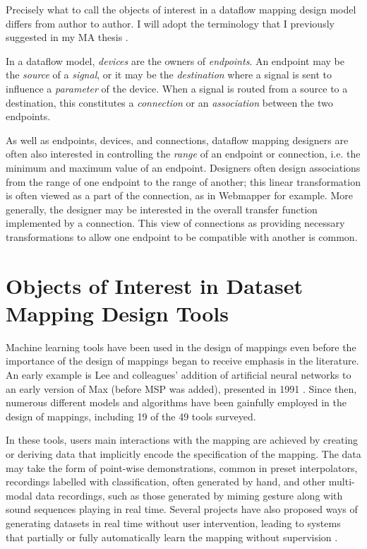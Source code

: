 \documentclass[main.tex]{subfiles}
\begin{document}

Precisely what to call the objects of interest in a dataflow mapping design
model differs from author to author. I will adopt the terminology that I
previously suggested in my MA thesis \cite{West2020thesis}.

In a dataflow model, \emph{devices} are the owners of \emph{endpoints}.  An
endpoint may be the \emph{source} of a \emph{signal}, or it may be the
\emph{destination} where a signal is sent to influence a \emph{parameter} of
the device.  When a signal is routed from a source to a destination, this
constitutes a \emph{connection} or an \emph{association} between the two
endpoints.

As well as endpoints, devices, and connections, dataflow mapping designers are
often also interested in controlling the \emph{range} of an endpoint or
connection, i.e. the minimum and maximum value of an endpoint. Designers often
design associations from the range of one endpoint to the range of another;
this linear transformation is often viewed as a part of the connection, as in
Webmapper \cite{Wang2019} for example. More generally, the designer may be
interested in the overall transfer function implemented by a connection. This
view of connections as providing necessary transformations to allow one endpoint
to be compatible with another is common.

\section{Objects of Interest in Dataset Mapping Design Tools}

Machine learning tools have been used in the design of mappings even before the
importance of the design of mappings began to receive emphasis in the
literature.  An early example is Lee and colleagues' addition of artificial
neural networks to an early version of Max (before MSP was added), presented in
1991 \cite{lee1991ann}.  Since then, numerous different models and algorithms
have been gainfully employed in the design of mappings, including 19 of the 49
tools surveyed.

In these tools, users main interactions with the mapping are achieved by
creating or deriving data that implicitly encode the specification of the
mapping. The data may take the form of point-wise demonstrations, common in
preset interpolators, recordings labelled with classification, often generated
by hand, and other multi-modal data recordings, such as those generated by
miming gesture along with sound sequences playing in real time. Several
projects have also proposed ways of generating datasets in real time without
user intervention, leading to systems that partially or fully automatically
learn the mapping without supervision \cite{smith2011self-supervising,
scurto2017online-clustering, delaspozas2020nime,
murray-browne2021nime_latent-mappings}.
\end{document}
